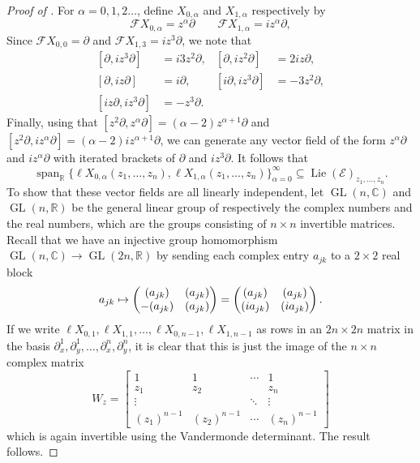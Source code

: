 \documentclass[10pt]{amsart}
\theoremstyle{remark}
\newcommand{\R}{\mathbb{R}}
\newcommand{\C}{\mathbb{C}}
\let\Re\relax
\DeclareMathOperator{\Re}{Re}
\let\Im\relax
\DeclareMathOperator{\Im}{Im}
\DeclareMathOperator{\spn}{span}
\DeclareMathOperator{\GL}{GL}
\DeclareMathOperator{\Lie}{Lie}
\newcommand{\scrF}{\mathscr{F}}
\newcommand{\E}{\mathcal{E}}
\numberwithin{equation}{section}
\begin{document}
\begin{proof}[Proof of ]
For $\alpha =0,1,2 \dots$, define $X_{0,\alpha}$ and $X_{1,\alpha}$ respectively by
$$\scrF X_{0,\alpha} = z^\alpha \partial \qquad \scrF X_{1,\alpha} = i z^\alpha \partial,$$
Since $\scrF X_{0,0} = \partial$ and $\scrF X_{1,3} = i z^3 \partial$, we note that
\begin{align}
{[\partial, iz^3 \partial]} & = i 3z^2 \partial, & {[\partial, iz^2 \partial ]} & = 2iz \partial, \\
{[\partial, iz \partial]} & = i  \partial, & {[i\partial, iz^3 \partial ]} & = -3z^2 \partial, \\
{[iz\partial, iz^3 \partial]} & = -z^3  \partial.
\end{align}
Finally, using that $[z^2\partial, z^\alpha \partial] = (\alpha-2) z^{\alpha+1} \partial$ and $[z^2\partial, iz^\alpha \partial] = (\alpha-2) iz^{\alpha+1} \partial$, we can generate any vector field of the form $z^\alpha \partial$ and $iz^\alpha \partial$ with iterated brackets of $\partial$ and $i z^3 \partial$. It follows that
$$\spn_{\mathbb{R}} \{ \ell X_{0,\alpha}(z_1, \dots, z_n), \ell X_{1,\alpha}(z_1, \dots, z_n)\}_{\alpha=0}^\infty \subseteq \Lie(\E)_{z_1,\dots, z_n}.$$
To show that these vector fields are all linearly independent, let $\GL(n,\mathbb{C})$ and $\GL(n, \R)$ be the general linear group of respectively the complex numbers and the real numbers, which are the groups consisting of $n\times n$ invertible matrices. Recall that we have an injective group homomorphism $\GL(n,\C) \to \GL(2n,\R)$ by sending each complex entry $a_{jk}$ to a $2 \times 2$ real block
$$a_{jk} \mapsto \begin{pmatrix} \Re(a_{jk}) & \Im(a_{jk}) \\ - \Im(a_{jk}) & \Re(a_{jk}) \end{pmatrix} = \begin{pmatrix} \Re(a_{jk}) & \Im(a_{jk}) \\ \Re(ia_{jk}) & \Im(ia_{jk}) \end{pmatrix}.$$
If we write $\ell X_{0,1}, \ell X_{1,1}, \dots, \ell X_{0,n-1}, \ell X_{1,n-1}$ as rows in an $2n \times 2n$ matrix in the basis $\partial^1_x, \partial^1_y, \dots , \partial^n_x, \partial^n_y$, it is clear that this is just the image of the $n\times n$ complex matrix
\begin{equation} W_z =
		\begin{bmatrix}
		1 			& 1 			& \cdots 	& 1 \\
		z_1 		& z_2	 		& 			& z_n \\
		\vdots 		& 				& \ddots	& \vdots \\
		(z_1)^{n-1}		& (z_2)^{n-1}		& \cdots	& (z_n)^{n-1}
		\end{bmatrix}
		\end{equation}
which is again invertible using the Vandermonde determinant. The result follows.
\end{proof}
\end{document}
